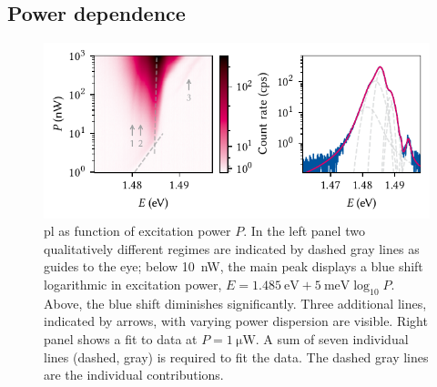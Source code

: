 \subsection{Power dependence}\label{subsec:exp:observations:pl:power}
\begin{figure}
    \centering
    \includegraphics{img/pdf/experiment/doped_M1_05_49-2_power}
    \caption[
        \protect\newline
    ]{
        \Gls{pl} as function of excitation power $P$.
        In the left panel two qualitatively different regimes are indicated by dashed gray lines as guides to the eye; below \qty{10}{\nano\watt}, the main peak displays a blue shift logarithmic in excitation power, $E = \qty{1.485}{\electronvolt} + \qty{5}{\milli\electronvolt}\log_{10} P$.
        Above, the blue shift diminishes significantly.
        Three additional lines, indicated by arrows, with varying power dispersion are visible.
        Right panel shows a fit to data at $P=\qty{1}{\micro\watt}$.
        A sum of seven individual lines (dashed, gray) is required to fit the data.
        The dashed gray lines are the individual contributions.
    }
    \label{fig:exp:pl:doped_M1_05_49-2_power}
\end{figure}

